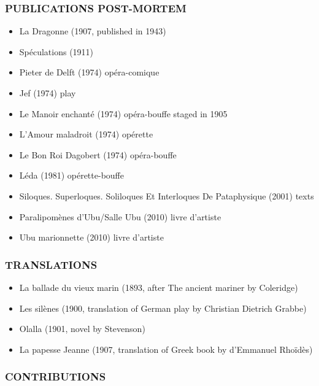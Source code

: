 \subsubsection{PUBLICATIONS POST-MORTEM}

\begin{itemize}
  \item La Dragonne (1907, published in 1943)
  \item Spéculations (1911)
  \item Pieter de Delft (1974) opéra-comique
  \item Jef (1974) play
  \item Le Manoir enchanté (1974) opéra-bouffe staged in 1905
  \item L’Amour maladroit (1974) opérette
  \item Le Bon Roi Dagobert (1974) opéra-bouffe
  \item Léda (1981) opérette-bouffe
  \item Siloques. Superloques. Soliloques Et Interloques De Pataphysique (2001) texts
  \item Paralipomènes d'Ubu/Salle Ubu (2010) livre d'artiste
  \item Ubu marionnette (2010) livre d'artiste
\end{itemize}

\subsubsection{TRANSLATIONS}

\begin{itemize}
  \item La ballade du vieux marin (1893, after The ancient mariner by Coleridge)
  \item Les silènes (1900, translation of German play by Christian Dietrich Grabbe)
  \item Olalla (1901, novel by Stevenson)
  \item La papesse Jeanne (1907, translation of Greek book by d’Emmanuel Rhoïdès)
\end{itemize}

\subsubsection{CONTRIBUTIONS}

